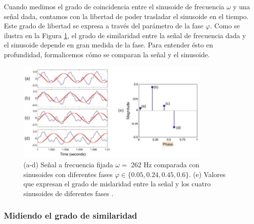 \documentclass{article}
\begin{document}
Cuando medimos el grado de coincidencia entre el sinusoide de frecuencia $\omega$ y una señal dada, contamos con la libertad de poder trasladar el sinusoide en el tiempo. Este grado de libertad se expresa a través del parámetro de la fase $\varphi$. Como se ilustra en la Figura \ref{fig:6.2}, el grado de similaridad entre la señal de frecuencia dada y el sinusoide depende en gran medida de la fase. Para entender ésto en profundidad, formalicemos cómo se comparan la señal y el sinusoide.

\begin{figure}[H]
\centering
    \includegraphics[width=0.85\textwidth]{images/82.jpeg}
    \caption{(a-d) Señal a frecuencia fijada $\omega=$ 262 Hz comparada con sinusoides con diferentes fases $\varphi\in\{0.05,0.24,0.45,0.6\}$. (e) Valores que expresan el grado de mislaridad entre la señal y los cuatro sinusoides de diferentes fases \cite[Capítulo 2]{muller2015fundamentals}.}
  \label{fig:6.2}
\end{figure}

\subsubsection{Midiendo el grado de similaridad}
\end{document}

